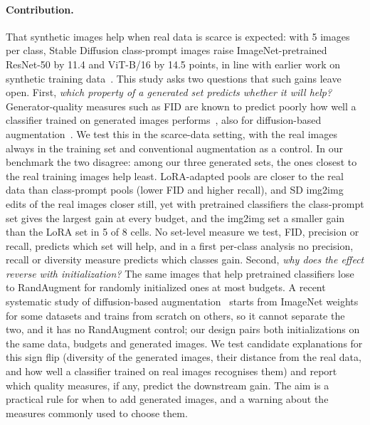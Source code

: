\documentclass{scrartcl}
\begin{document}
\paragraph{Contribution.}
That synthetic images help when real data is scarce is expected: with 5 images per class, Stable Diffusion
class-prompt images raise ImageNet-pretrained ResNet-50 by 11.4 and ViT-B/16 by 14.5 points, in line with
earlier work on synthetic training data~\cite{he2023synthetic}. This study asks two questions that such
gains leave open. First, \emph{which property of a generated set predicts whether it will help?}
Generator-quality measures such as FID are known to predict poorly how well a classifier trained on
generated images performs~\cite{ravuri2019classification}, also for diffusion-based
augmentation~\cite{li2026diffusion}. We test this in the scarce-data setting, with the real images always
in the training set and conventional augmentation as a control. In our benchmark the two disagree:
among our three generated sets, the ones closest to the real training images help least. LoRA-adapted pools
are closer to the real data than class-prompt pools (lower FID and higher recall), and SD img2img edits of
the real images closer still, yet with pretrained classifiers the class-prompt set gives the largest gain at
every budget, and the img2img set a smaller gain than the LoRA set in 5 of 8 cells. No set-level measure we test, FID, precision or
recall, predicts which set will help, and in a first per-class analysis no precision, recall or diversity
measure predicts which classes gain. Second, \emph{why does the effect reverse with initialization?} The same images that help pretrained
classifiers lose to RandAugment for randomly initialized ones at most budgets. A recent systematic study of
diffusion-based augmentation~\cite{li2026diffusion} starts from ImageNet weights for some datasets and trains
from scratch on others, so it cannot separate the two, and it has no RandAugment control; our design pairs
both initializations on the same data, budgets and generated images. We test candidate explanations for
this sign flip (diversity of the generated images, their distance from the real data, and how well a
classifier trained on real images recognises them) and report which quality measures, if any, predict the
downstream gain. The aim is a practical rule for when to add generated images, and a warning about the
measures commonly used to choose them.

\end{document}
